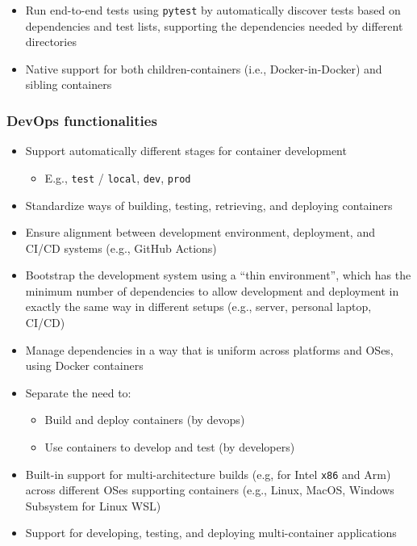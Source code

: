 \documentclass{article}
\begin{document}
\begin{itemize}

  \item Run end-to-end tests using \texttt{pytest} by automatically discover
    tests based on dependencies and test lists, supporting the dependencies needed
    by different directories

  \item Native support for both children-containers (i.e., Docker-in-Docker) and
    sibling containers
\end{itemize}

\subsubsection{DevOps functionalities}
\label{devops-functionalities}

\begin{itemize}

  \item Support automatically different stages for container development

    \begin{itemize}

      \item E.g., \texttt{test} / \texttt{local}, \texttt{dev}, \texttt{prod}
    \end{itemize}

  \item Standardize ways of building, testing, retrieving, and deploying
    containers

  \item Ensure alignment between development environment, deployment, and CI/CD systems
    (e.g., GitHub Actions)

  \item Bootstrap the development system using a ``thin environment'', which has
    the minimum number of dependencies to allow development and deployment in
    exactly the same way in different setups (e.g., server, personal laptop, CI/CD)

  \item Manage dependencies in a way that is uniform across platforms and OSes,
    using Docker containers

  \item Separate the need to:

    \begin{itemize}

      \item Build and deploy containers (by devops)

      \item Use containers to develop and test (by developers)
    \end{itemize}

  \item Built-in support for multi-architecture builds (e.g, for Intel \texttt{x86}
    and Arm) across different OSes supporting containers (e.g., Linux, MacOS,
    Windows Subsystem for Linux WSL)

  \item Support for developing, testing, and deploying multi-container applications
\end{itemize}
\end{document}
